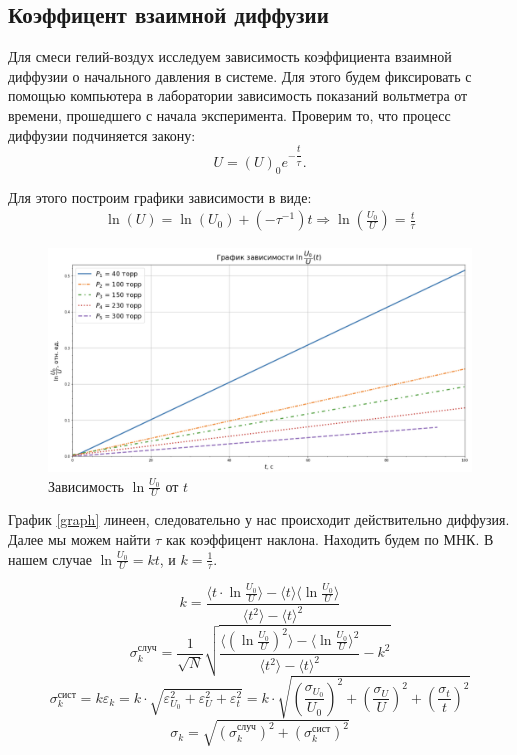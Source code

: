 \documentclass[a4paper,12pt]{article}
\theoremstyle{definition}
\begin{document}
		\subsection{Коэффицент взаимной диффузии}
		
		Для смеси гелий-воздух исследуем зависимость коэффициента взаимной диффузии о начального давления в системе. Для этого будем фиксировать с помощью компьютера в лаборатории зависимость показаний вольтметра от времени, прошедшего с начала эксперимента. Проверим то, что процесс диффузии подчиняется закону: \[U = (U)_0e^{-\dfrac{t}{\tau}}.\]
		
		Для этого построим графики зависимости в виде:
		\begin{align}
			 \ln(U) = \ln(U_0) + (-\tau^{-1})t \Rightarrow \ln\left(\frac{U_0}{U}\right) = \frac{t}{\tau}
		\end{align}
		
		\begin{figure}[h!]
			\centering
			\includegraphics[scale=0.542]{graph1}
			\caption{Зависимость $ \ln\frac{U_0}{U} $ от $ t $}
			\label{graph}
		\end{figure}
	
		График \eqref{graph} линеен, следовательно у нас происходит действительно диффузия. Далее мы можем найти $\tau$ как коэффицент наклона. Находить будем по МНК. В нашем случае $\ln\frac{U_0}{U} = k t$, и $k = \frac{1}{\tau}$.
		
		\begin{equation}
			k=\frac{\langle t\cdot \ln \frac{U_0}{U} \rangle - \langle t\rangle \langle \ln \frac{U_0}{U}\rangle}{\langle t^2 \rangle - \langle t \rangle^2} 
		\end{equation}
		\begin{equation}
			\sigma_k^\text{случ}=\frac{1}{\sqrt{N}}\sqrt{\frac{\langle \left(\ln\frac{U_0}{U}\right)^2 \rangle - \langle \ln\frac{U_0}{U} \rangle^2}{\langle t^2 \rangle - \langle t \rangle^2} - k^2  }
		\end{equation}
		\begin{equation}
			\sigma_k^{\text{сист}} = k\varepsilon_k =  k\cdot\sqrt{\varepsilon_{U_0}^2 + \varepsilon_U^2 + \varepsilon_t^2} = k\cdot\sqrt{\left(\frac{\sigma_{U_0}}{U_0}\right)^2+ \left(\frac{\sigma_{U}}{U}\right)^2 + \left(\frac{\sigma_t}{t}\right)^2} 
		\end{equation}
		\begin{equation}
			\sigma_k = \sqrt{\left( \sigma_k^\text{случ} \right)^2 + \left( \sigma_k^\text{сист} \right)^2 }
		\end{equation}
	
\end{document}
